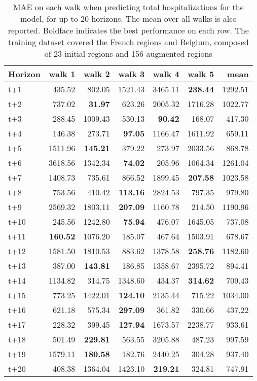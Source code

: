 \begin{table}[H]
\centering
\caption{MAE on each walk when predicting total hospitalizations for the model, for up to 20 horizons. The mean over all walks is also reported. Boldface indicates the best performance on each row. The training dataset covered the French regions and Belgium, composed of 23 initial regions and 156 augmented regions }
\label{tab:MAE_walk_dense_model}
\begin{tabular}{lrrrrrr}
\toprule
Horizon &  walk 1 &  walk 2 &  walk 3 &  walk 4 &  walk 5 &    mean \\
\midrule
t+1  & 435.52  & 802.05  & 1521.43  & 3465.11  & \textbf{238.44}  & 1292.51  \\
t+2  & 737.02  & \textbf{31.97}  & 623.26  & 2005.32  & 1716.28  & 1022.77  \\
t+3  & 288.45  & 1009.43  & 530.13  & \textbf{90.42}  & 168.07  & 417.30  \\
t+4  & 146.38  & 273.71  & \textbf{97.05}  & 1166.47  & 1611.92  & 659.11  \\
t+5  & 1511.96  & \textbf{145.21}  & 379.22  & 273.97  & 2033.56  & 868.78  \\
t+6  & 3618.56  & 1342.34  & \textbf{74.02}  & 205.96  & 1064.34  & 1261.04  \\
t+7  & 1408.73  & 735.61  & 866.52  & 1899.45  & \textbf{207.58}  & 1023.58  \\
t+8  & 753.56  & 410.42  & \textbf{113.16}  & 2824.53  & 797.35  & 979.80  \\
t+9  & 2569.32  & 1803.11  & \textbf{207.09}  & 1160.78  & 214.50  & 1190.96  \\
t+10  & 245.56  & 1242.80  & \textbf{75.94}  & 476.07  & 1645.05  & 737.08  \\
t+11  & \textbf{160.52}  & 1076.20  & 185.07  & 467.64  & 1503.91  & 678.67  \\
t+12  & 1581.50  & 1810.53  & 883.62  & 1378.58  & \textbf{258.76}  & 1182.60  \\
t+13  & 387.00  & \textbf{143.81}  & 186.85  & 1358.67  & 2395.72  & 894.41  \\
t+14  & 1134.82  & 314.75  & 1348.60  & 434.37  & \textbf{314.62}  & 709.43  \\
t+15  & 773.25  & 1422.01  & \textbf{124.10}  & 2135.44  & 715.22  & 1034.00  \\
t+16  & 621.18  & 575.34  & \textbf{297.09}  & 361.82  & 330.66  & 437.22  \\
t+17  & 228.32  & 399.45  & \textbf{127.94}  & 1673.57  & 2238.77  & 933.61  \\
t+18  & 501.49  & \textbf{229.81}  & 563.55  & 3205.88  & 487.23  & 997.59  \\
t+19  & 1579.11  & \textbf{180.58}  & 182.76  & 2440.25  & 304.28  & 937.40  \\
t+20  & 408.38  & 1364.04  & 1423.10  & \textbf{219.21}  & 324.81  & 747.91  \\

\bottomrule
\end{tabular}
\end{table}
